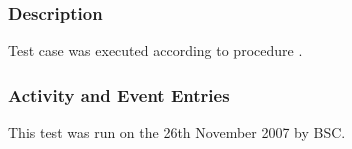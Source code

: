 




\subsubsection{Description}
Test case  was executed according to procedure .

\subsubsection{Activity and Event Entries}
This test was run on the 26th November 2007 by BSC.

